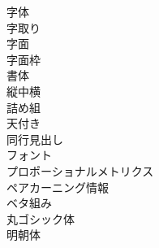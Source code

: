 \begin{description}
    \item[字体]
    \item[字取り]
    \item[字面]
    \item[字面枠]
    \item[書体]
    \item[縦中横]
    \item[詰め組]
    \item[天付き]
    \item[同行見出し]
    \item[フォント]
    \item[プロポーショナルメトリクス]
    \item[ペアカーニング情報]
    \item[ベタ組み]
    \item[丸ゴシック体]
    \item[明朝体]
\end{description}


